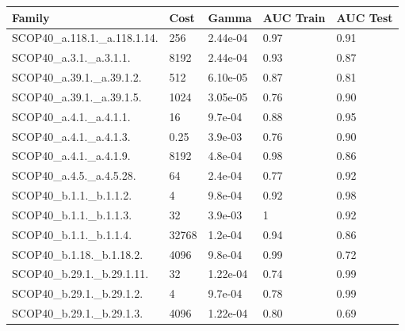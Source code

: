 \documentclass[11pt]{article}
\begin{document}
\begin{longtable}{|p{}|p{}|p{}|p{}|p{}|}
	\hline
	\textbf{Family}               & \textbf{Cost} & \textbf{Gamma}   & \textbf{AUC Train} & \textbf{AUC Test} \\ \hline
	SCOP40\_a.118.1.\_a.118.1.14. & 256     & 2.44e-04   & 0.97 & 0.91 \\ \hline

	SCOP40\_a.3.1.\_a.3.1.1.      & 8192    & 2.44e-04   & 0.93 & 0.87 \\ \hline

	SCOP40\_a.39.1.\_a.39.1.2.    & 512     & 6.10e-05   & 0.87 & 0.81 \\ \hline

	SCOP40\_a.39.1.\_a.39.1.5.    & 1024    & 3.05e-05   & 0.76 & 0.90 \\ \hline

	SCOP40\_a.4.1.\_a.4.1.1.      & 16      & 9.7e-04    & 0.88 & 0.95 \\ \hline

	SCOP40\_a.4.1.\_a.4.1.3.      & 0.25    & 3.9e-03    & 0.76 & 0.90 \\ \hline
	
	SCOP40\_a.4.1.\_a.4.1.9.      & 8192    & 4.8e-04    & 0.98 & 0.86 \\ \hline
	
	SCOP40\_a.4.5.\_a.4.5.28.     & 64      & 2.4e-04    & 0.77 & 0.92 \\ \hline
	
	SCOP40\_b.1.1.\_b.1.1.2.      & 4       & 9.8e-04    & 0.92 & 0.98 \\ \hline
	
	SCOP40\_b.1.1.\_b.1.1.3.      & 32      & 3.9e-03    & 1    & 0.92 \\ \hline
	
	SCOP40\_b.1.1.\_b.1.1.4.      & 32768   & 1.2e-04    & 0.94 & 0.86 \\ \hline
	
	SCOP40\_b.1.18.\_b.1.18.2.    & 4096    & 9.8e-04    & 0.99 & 0.72 \\ \hline
	
	SCOP40\_b.29.1.\_b.29.1.11.   & 32      & 1.22e-04   & 0.74 & 0.99 \\ \hline
	
	SCOP40\_b.29.1.\_b.29.1.2.    & 4       & 9.7e-04    & 0.78 & 0.99 \\ \hline
	
	SCOP40\_b.29.1.\_b.29.1.3.    & 4096    & 1.22e-04   & 0.80  & 0.69 \\ \hline
	

\end{longtable}
\end{document}
